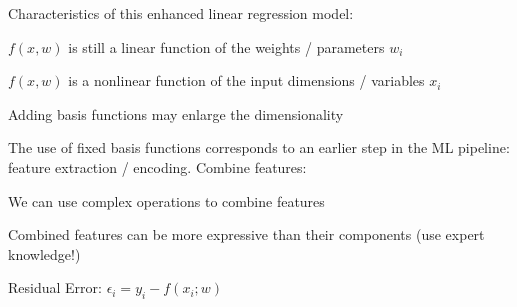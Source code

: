 \documentclass[landscape, a4paper]{article}
\begin{document}
\begin{minipage}[t]{0.2\linewidth}
\begin{betterlist}
\begin{betterlist}
\begin{betterlist}
				\item Characteristics of this \alert{enhanced} linear regression model:
				\begin{betterlist}
					\item $f(x, w)$ is still a linear function of the weights / parameters $w_i$
					\item $f(x, w)$ is a \alert{nonlinear} function of the input dimensions / variables $x_i$
					\item Adding basis functions may enlarge the dimensionality
					\item The use of fixed basis functions corresponds to an earlier step in the ML pipeline: \alert{feature extraction / encoding. Combine features:}
					\begin{betterlist}
						\item We can use complex operations to combine features
						\item Combined features can be more expressive than their components (use expert knowledge!)
					\end{betterlist}
				\end{betterlist}
			\end{betterlist}
			\item {}
			\begin{betterlist}
				\item \alert{Residual Error:} $\displaystyle \epsilon_i = y_i − f(x_i; w)$

\end{betterlist}
\end{betterlist}
\end{betterlist}
\end{minipage}
\end{document}
